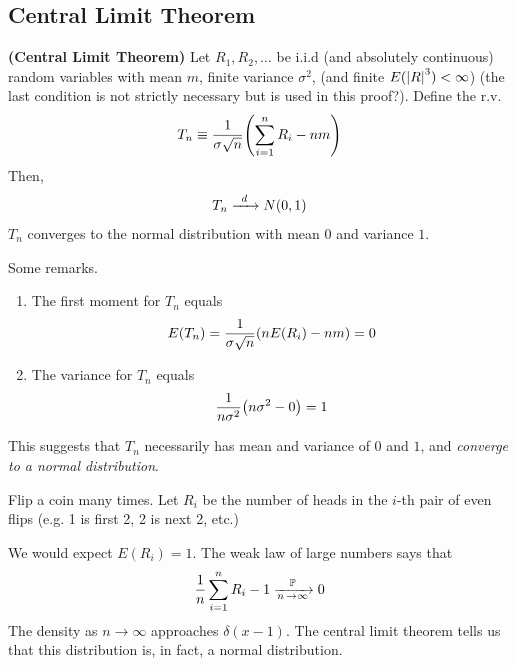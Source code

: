\subsection{Central Limit Theorem}
\begin{theorem}
    \textbf{(Central Limit Theorem)} Let $R_1, R_2, \ldots$ be i.i.d (and absolutely continuous) random variables with mean $m$, finite variance $\sigma^2$, (and finite $E(\abs{R}^3) < \infty$) (the last condition is not strictly necessary but is used in this proof?). Define the r.v.
    \begin{align}
        T_n \equiv \frac{1}{\sigma \sqrt{n}} \qty(\sum_{i=1}^n R_i - nm)
    \end{align}
    Then,
    \begin{align}
        T_n \ce{->[$d$]} N(0,1)
    \end{align}
    $T_n$ converges to the normal distribution with mean $0$ and variance $1$.
\end{theorem}

\begin{aside}
    Some remarks.
    \begin{enumerate}
        \item The first moment for $T_n$ equals
        \begin{align}
            E(T_n) = \frac{1}{\sigma \sqrt{n}} \qty(n E(R_i) - nm) = 0
        \end{align}
        \item The variance for $T_n$ equals
        \begin{align}
            \frac{1}{n\sigma^2} \qty(n \sigma^2 - 0) = 1
        \end{align}
    \end{enumerate}
    This suggests that $T_n$ necessarily has mean and variance of $0$ and $1$, and \textit{converge to a normal distribution}.
\end{aside}

\begin{example}
    Flip a coin many times. Let $R_i$ be the number of heads in the $i$-th pair of even flips (e.g. 1 is first 2, 2 is next 2, etc.)
\end{example}
\begin{solution}
    We would expect $E(R_i) = 1$. The weak law of large numbers says that
    \begin{align}
        \frac{1}{n} \sum_{i=1}^n R_i - 1 \ce{->[$\probability$][n \to \infty]} 0
    \end{align}
    The density as $n \to \infty$ approaches $\delta(x - 1)$. The central limit theorem tells us that this distribution is, in fact, a normal distribution. 
\end{solution}

